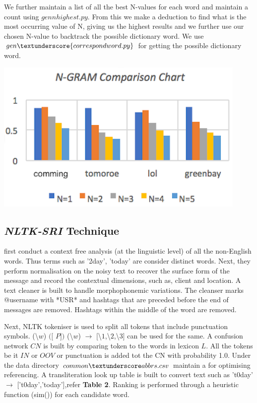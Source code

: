 We further maintain a list of all the best N-values for each word and maintain a 
count using ${gennhighest.py}$. From this we make a deduction to find what is the most occurring value of N, giving us the highest results and we further use our chosen N-value to backtrack the possible dictionary word. We use ${gen}
\textunderscore{correspondword.py}$ for getting the possible dictionary word.

\includegraphics {finalgraph4.pdf}
   
\subsection{{\itshape NLTK-SRI} Technique}

{\citet{gmctw14}} first conduct a context free analysis (at the linguistic level) of all the non-English words. Thus terms such as '2day', 'today' are consider distinct words. Next, they perform normalisation on the noisy text to recover the surface form of the message and record the contextual dimensions, such as, client and location. A text cleaner is built to handle morphophonemic variations. The cleanser marks @username with *USR* and hashtags that are preceded before the end of messages are removed. Hashtags within the middle of the word are removed.

Next, NLTK tokeniser is used to split all tokens that include punctuation symbols. (\textbackslash$w$\text{*}) $($$[$ $P$$]$$)$ (\textbackslash$w$\text{*}) $\rightarrow$ $[$\textbackslash$1$,\textbackslash$2$,\textbackslash$3$$]$ can be used for the same. A confusion network $CN$ is built by comparing token to the words in lexicon $L$. All the tokens be it $IN$ or $OOV$ or punctuation is added tot the CN with probability 1.0. Under the data directory $common\textunderscore abbrs.csv$ maintain a for optimising referencing. A transliteration look up table is built to convert text such as 't0day' $\rightarrow$ ['t0day','today'],refer \textbf{Table 2}. Ranking is performed through a heuristic function (sim()) for each candidate word. 

